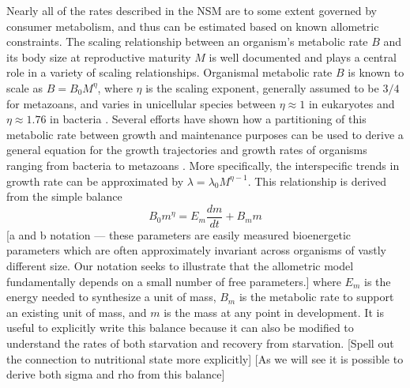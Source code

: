 \documentclass{pnastwo}
\begin{document}
\begin{article}
Nearly all of the rates described in the NSM are to some extent governed by consumer metabolism, and thus can be estimated based on known allometric constraints. 
The scaling relationship between an organism's metabolic rate $B$ and its body size at reproductive maturity $M$ is well documented \cite{West:2002it} and plays a central role in a variety of scaling relationships.
Organismal metabolic rate $B$ is known to scale as $B = B_0 M^\eta$, where $\eta$ is the scaling exponent, generally assumed to be $3/4$ for metazoans, and varies in unicellular species between $\eta\approx 1$ in eukaryotes and $\eta\approx 1.76$ in bacteria \cite{DeLong:2010dy}. Several efforts have shown how a partitioning of this metabolic rate between growth and maintenance purposes can be used to derive a general equation for the growth trajectories and growth rates of organisms ranging from bacteria to metazoans \cite{Kempes:2012hy}. More specifically, the interspecific trends in growth rate can be approximated by $\lambda = \lambda_0 M^{\eta-1}$. This relationship is derived from the simple balance
 \begin{equation}
 B_{0}m^{\eta}=E_{m}\frac{dm}{dt}+B_{m}m
 \label{balance}
 \end{equation}
 [a and b notation --- these parameters are easily measured bioenergetic parameters which are often approximately invariant across organisms of vastly different size. Our notation seeks to illustrate that the allometric model fundamentally depends on a small number of free parameters.]
 where $E_{m}$ is the energy needed to synthesize a unit of mass, $B_{m}$ is the metabolic rate to support an existing unit of mass, and $m$ is the mass at any point in development. It is useful to explicitly write this balance because it can also be modified to understand the rates of both starvation and recovery from starvation. [Spell out the connection to nutritional state more explicitly] [As we will see it is possible to derive both sigma and rho from this balance]
 

\end{article}
\end{document}
